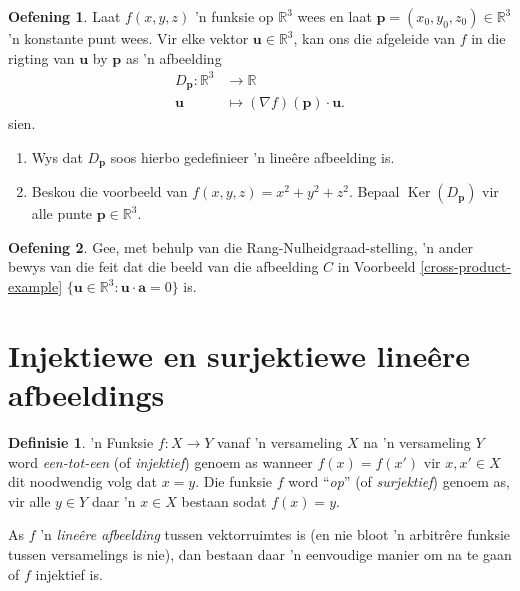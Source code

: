 \documentclass[a4paper,11pt]{book}
\theoremstyle{definition}
\newtheorem{definition}[theorem]{Definisie}
\newtheorem{exercise}{Oefening}
\newcommand{\ve}[1]{\mathbf{#1}}
\DeclareMathOperator{\Ker}{Ker}
\begin{document}
\begin{exercise} Laat $f(x,y,z)$ 'n funksie op $\mathbb{R}^3$ wees en laat
	$\ve{p} = (x_0, y_0, z_0) \in \mathbb{R}^3$ 'n konstante punt wees. Vir
	elke vektor $\ve{u} \in \mathbb{R}^3$,  kan ons die afgeleide van $f$
	in die rigting van $\ve{u}$ by $\ve{p}$ as 'n afbeelding
	\begin{align*}
		D_{\ve{p}} : \mathbb{R}^3 &\rightarrow \mathbb{R} \\
		\ve{u} &\mapsto (\nabla f)(\ve{p}) \cdot \ve{u}.
	\end{align*}
	sien.
	\begin{enumerate} 
		\item Wys dat $D_{\ve{p}}$ soos hierbo gedefinieer 'n line{\^e}re
			afbeelding is. 
		\item Beskou die voorbeeld van $f(x,y,z) = x^2 + y^2 + z^2$. Bepaal
			$\Ker(D_\ve{p})$ vir alle punte $\ve{p} \in \mathbb{R}^3$.
	\end{enumerate}
\end{exercise}


\begin{exercise} Gee, met behulp van die Rang-Nulheidgraad-stelling, 'n
	ander bewys van die feit dat die beeld van die afbeelding $C$ in
	Voorbeeld \ref{cross-product-example} $\{ \ve{u} \in \mathbb{R}^3 :
	\ve{u} \cdot \ve{a} = 0 \}$ is.
\end{exercise}



\section{Injektiewe en surjektiewe line{\^e}re afbeeldings}

\begin{definition} 'n Funksie $f : X \rightarrow Y$ vanaf 'n versameling
	$X$ na 'n versameling $Y$ word \emph{een-tot-een} (of \emph{injektief})
	genoem as wanneer $f(x) = f(x')$ vir $x, x' \in X$ dit noodwendig volg
	dat $x = y$. Die funksie $f$ word ``\emph{op}'' (of \emph{surjektief})
	genoem as, vir alle $y \in Y$ daar 'n $x \in X$ bestaan sodat $f(x) =
	y$.
\end{definition}

As $f$ 'n \emph{line{\^e}re afbeelding} tussen vektorruimtes is (en nie
bloot 'n arbitr{\^e}re funksie tussen versamelings is nie), dan bestaan
daar 'n eenvoudige manier om na te gaan of $f$ injektief is.
\end{document}
